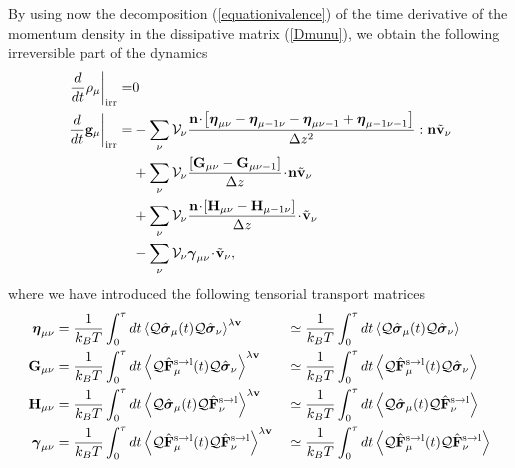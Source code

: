 \documentclass[b5paper,openright,10pt]{book}
\newcommand{\esc}{\!\cdot\!}
\begin{document}
By  using  now  the  decomposition  (\ref{equationivalence})  of  the  time
derivative  of   the  momentum  density  in   the  dissipative  matrix
(\ref{Dmunu}),  we  obtain  the  following irreversible  part  of  the
dynamics
\begin{align}
  \left.\frac{d}{dt}\rho_\mu\right|_{\rm irr}=& 0
\nonumber\\
\left.\frac{d}{dt}{\bf g}_\mu\right|_{\rm irr}=
&-\sum_{\nu}{\cal V}_\nu \frac{{\bf n}\esc\left[\boldsymbol{\eta}_{\mu\nu}-\boldsymbol{\eta}_{\mu-1\nu}-\boldsymbol{\eta}_{\mu\nu-1}+\boldsymbol{\eta}_{\mu-1\nu-1}\right]}{\Delta z^2}:{\bf n}\tilde{\bf v}_\nu
\nonumber\\
&+\sum_{\nu}{\cal V}_\nu\frac{\left[{\bf G}_{\mu\nu}-{\bf G}_{\mu\nu-1}\right]}{\Delta z}\esc{\bf n}\tilde{\bf v}_\nu
\nonumber\\
&+\sum_{\nu}{\cal V}_\nu\frac{{\bf n}\esc\left[{\bf H}_{\mu\nu}-{\bf H}_{\mu-1\nu}\right]}{\Delta z}\esc\tilde{\bf v}_\nu
\nonumber\\
&-\sum_{\nu}{\cal V}_\nu\boldsymbol{\gamma}_{\mu\nu}\esc\tilde{\bf v}_\nu,
\label{Irr-Fin}
\end{align}
where we have introduced the following tensorial transport matrices
\begin{align}
\boldsymbol{\eta}_{\mu\nu}
&=\frac{1}{k_BT}\int_0^{\tau} dt
\left\langle {\cal Q}\hat{\boldsymbol{\sigma}}_{\mu}(t){\cal Q}\hat{\boldsymbol{\sigma}}_{\nu}
\right\rangle^{\lambda{\bf v}}
&&\simeq\frac{1}{k_BT}\int_0^{\tau} dt
\left\langle {\cal Q}\hat{\boldsymbol{\sigma}}_{\mu}(t){\cal Q}\hat{\boldsymbol{\sigma}}_{\nu}
\right\rangle
\nonumber\\
{\bf G}_{\mu\nu}
&=\frac{1}{k_BT}\int_0^{\tau} dt
\left\langle{\cal Q}\hat{\bf F}^{\rm s\to l}_\mu(t)
{\cal Q}\hat{\boldsymbol{\sigma}}_\nu
\right\rangle^{\lambda{\bf v}}
&&\simeq\frac{1}{k_BT}\int_0^{\tau} dt
\left\langle{\cal Q}\hat{\bf F}^{\rm s\to l}_\mu(t)
{\cal Q}\hat{\boldsymbol{\sigma}}_\nu
\right\rangle
\nonumber\\
{\bf H}_{\mu\nu}&=
\frac{1}{k_BT}\int_0^{\tau} dt
\left\langle{\cal Q}\hat{\boldsymbol{\sigma}}_\mu(t){\cal Q}\hat{\bf F}^{\rm s\to l}_\nu\right\rangle^{\lambda{\bf v}}
&&\simeq\frac{1}{k_BT}\int_0^{\tau} dt
\left\langle{\cal Q}\hat{\boldsymbol{\sigma}}_\mu(t){\cal Q}\hat{\bf F}^{\rm s\to l}_\nu\right\rangle
\nonumber\\
\boldsymbol{\gamma}_{\mu\nu}
&=\frac{1}{k_BT}\int_0^{\tau} dt
\left\langle 
{\cal Q}\hat{\bf F}^{\rm s\to l}_\mu(t)
{\cal Q}\hat{\bf F}^{\rm s\to l}_\nu\right\rangle^{\lambda{\bf v}}
&&\simeq\frac{1}{k_BT}\int_0^{\tau} dt
\left\langle 
{\cal Q}\hat{\bf F}^{\rm s\to l}_\mu(t)
{\cal Q}\hat{\bf F}^{\rm s\to l}_\nu\right\rangle
\label{MolTransportCoeff}
\end{align}
\end{document}

